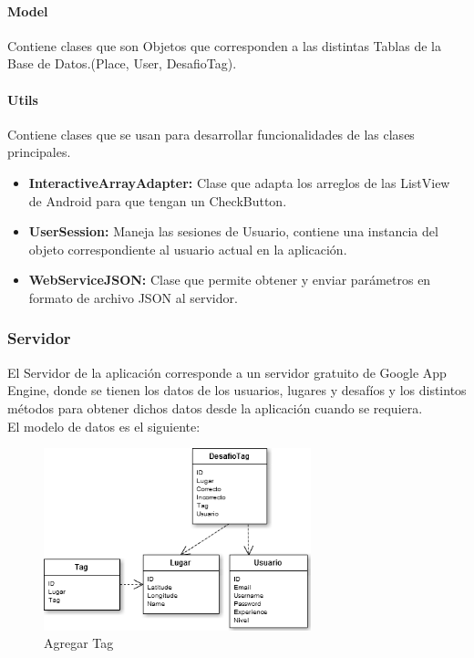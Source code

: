 \documentclass[10pt,letterpaper]{article}
\begin{document}
\paragraph{Model}

Contiene clases que son Objetos que corresponden a las distintas Tablas de la Base de Datos.(Place, User, DesafioTag).\\

\paragraph{Utils}

Contiene clases que se usan para desarrollar funcionalidades de las clases principales.\\

\begin{itemize}
 \item \textbf{InteractiveArrayAdapter:} Clase que adapta los arreglos de las ListView de Android para que tengan un CheckButton.
 \item \textbf{UserSession:} Maneja las sesiones de Usuario, contiene una instancia del objeto correspondiente al usuario actual en la aplicación.
 \item \textbf{WebServiceJSON:} Clase que permite obtener y enviar parámetros en formato de archivo JSON al servidor.
\end{itemize}

\subsubsection{Servidor}

El Servidor de la aplicación corresponde a un servidor gratuito de Google App Engine, donde se tienen los datos de los usuarios, lugares y desafíos y los distintos métodos para obtener dichos datos desde la aplicación cuando se requiera.\\

El modelo de datos es el siguiente:\\

\begin{figure}[h]
\hspace{1.5cm}
\includegraphics[width=220pt]{./imgs/ModeloDatos.png}
\caption{Agregar Tag}
\end{figure}
\end{document}
